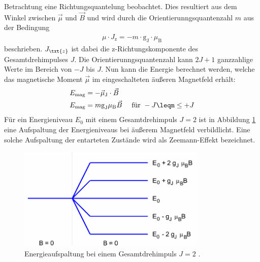Betrachtung eine Richtungsquantelung beobachtet. Dies resultiert aus dem Winkel
zwischen $\vec{\mu}$ und $\vec{B}$ und wird durch die
Orientierunngsquantenzahl $m$ aus der Bedingung
\begin{align}
  \mu \cdot J_\text{z} = - m \cdot \text{g}_\text{J}\cdot \mu_\text{B}
  \label{eqn:bedingung}
\end{align}
beschrieben. $J_\txt{z}$ ist dabei die z-Richtungskomponente des Gesamtdrehimpulses
$J$. Die Orientierunngsquantenzahl kann $2J+1$ ganzzahlige Werte im Bereich von
$-J$ bis $J$.
Nun kann die Energie berechnet werden, welche das magnetische Moment $\vec{\mu}$
im eingeschalteten äußeren Magnetfeld erhält:
\begin{align}
  E_\text{mag} &= -\vec{\mu}_\text{J} \cdot \vec{B} \\
  E_\text{mag} &= m \text{g}_\text{J} \mu_\text{B}\vec{B} \quad \text{ für } -J\leqm\leq+J
  \label{eqn:energie}
\end{align}
Für ein Energieniveau $E_0$ mit einem Gesamtdrehimpuls $J = \num{2}$ ist in Abbildung
\ref{abb:aufspaltung} eine Aufspaltung der Energieniveaus bei äußerem Magnetfeld
verbildlicht. Eine solche Aufspaltung der entarteten Zustände wird als Zeemann-Effekt
bezeichnet.
\begin{figure}[htb]
  \centering
  \includegraphics[width=0.8\textwidth]{images/V27_1.pdf}
  \caption{Energieaufspaltung bei einem Gesamtdrehimpuls $J = \num{2}$ \cite{anleitung}.}
  \label{abb:aufspaltung}
\end{figure}


